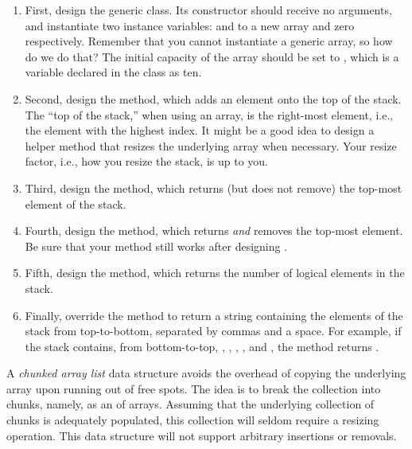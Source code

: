 \begin{enumerate}[label=(\alph*)]
    \item First, design the generic  class. Its constructor should receive no arguments, and instantiate two instance variables:  and  to a new array and zero respectively. Remember that you cannot instantiate a generic array, so how do we do that? The initial capacity of the array should be set to , which is a  variable declared in the class as ten.

    \item Second, design the  method, which adds an element onto the top of the stack. The ``top of the stack,'' when using an array, is the right-most element, i.e., the element with the highest index. It might be a good idea to design a  helper method that resizes the underlying array when necessary. Your resize factor, i.e., how you resize the stack, is up to you.

    \item Third, design the  method, which returns (but does not remove) the top-most element of the stack.

    \item Fourth, design the  method, which returns \textit{and} removes the top-most element. Be sure that your  method still works after designing .

    \item Fifth, design the  method, which returns the number of logical elements in the stack.

    \item Finally, override the  method to return a string containing the elements of the stack from top-to-bottom, separated by commas and a space. For example, if the stack contains, from bottom-to-top, , , , , and , the  method returns .
\end{enumerate}

\newpage %

A \emph{chunked array list} data structure avoids the overhead of copying the underlying array upon running out of free spots. The idea is to break the collection into chunks, namely, as an  of arrays. Assuming that the underlying collection of chunks is adequately populated, this collection will seldom require a resizing operation. This data structure will not support arbitrary insertions or removals.

